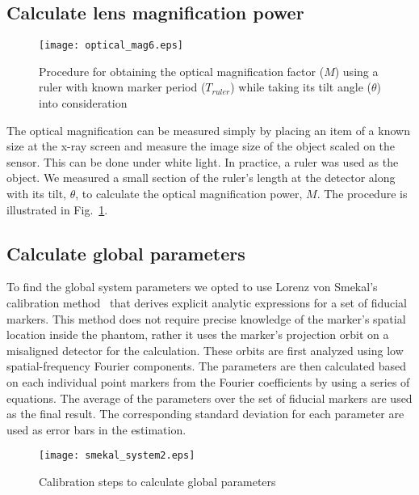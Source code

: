 \subsection{Calculate lens magnification power}
\begin{figure}[ht]
\centering
\texttt{[image: optical\_mag6.eps]}
\caption{Procedure for obtaining the optical magnification factor ($M$) using a ruler with known marker period ($T_{ruler}$) while taking its tilt angle ($\theta$) into consideration}
\label{fig:optical_mag}
\end{figure}
The optical magnification can be measured simply by placing an item of a known size at the x-ray screen and measure the image size of the object scaled on the sensor.  This can be done under white light.  In practice, a ruler was used as the object. We measured a small section of the ruler's length at the detector along with its tilt, $\theta$, to calculate the optical magnification power, $M$.  The procedure is illustrated in Fig.~\ref{fig:optical_mag}.

\subsection{Calculate global parameters}

To find the global system parameters we opted to use Lorenz von Smekal's calibration method~\citep{Smekal2004} that derives explicit analytic expressions for a set of fiducial markers.  This method does not require precise knowledge of the marker's spatial location inside the phantom, rather it uses the marker's projection orbit on a misaligned detector for the calculation.  These orbits are first analyzed using low spatial-frequency Fourier components.  The parameters are then calculated based on each individual point markers from the Fourier coefficients by using a series of equations.  The average of the parameters over the set of fiducial markers are used as the final result.  The corresponding standard deviation for each parameter are used as error bars in the estimation.

\begin{figure}[ht]
\texttt{[image: smekal\_system2.eps]}
\caption{Calibration steps to calculate global parameters}
\label{fig:smekal_method}
\end{figure}

